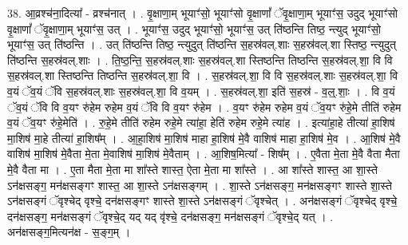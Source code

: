 \documentclass[17pt]{extarticle}
\begin{document}
38. आ॒व्रश्च॑ना॒दित्या᳚ - व्रश्च॑नात् । . वृ॒क्षाणा॒म् भूयाꣳ॑सो॒ भूयाꣳ॑सो वृ॒क्षाणां᳚ ॅवृ॒क्षाणा॒म् भूयाꣳ॑स॒ उदुद् भूयाꣳ॑सो वृ॒क्षाणां᳚ ॅवृ॒क्षाणा॒म् भूयाꣳ॑स॒ उत् । . भूयाꣳ॑स॒ उदुद् भूयाꣳ॑सो॒ भूयाꣳ॑स॒ उत् ति॑ष्ठन्ति तिष्ठ॒ न्त्युद् भूयाꣳ॑सो॒ भूयाꣳ॑स॒ उत् ति॑ष्ठन्ति । . उत् ति॑ष्ठन्ति तिष्ठ॒ न्त्युदुत् ति॑ष्ठन्ति स॒हस्र॑वल्.शाः स॒हस्र॑वल्.शा स्तिष्ठ॒ न्त्युदुत् ति॑ष्ठन्ति स॒हस्र॑वल्.शाः । . ति॒ष्ठ॒न्ति॒ स॒हस्र॑वल्.शाः स॒हस्र॑वल्.शा स्तिष्ठन्ति तिष्ठन्ति स॒हस्र॑वल्.शा॒ वि वि स॒हस्र॑वल्.शा स्तिष्ठन्ति तिष्ठन्ति स॒हस्र॑वल्.शा॒ वि । . स॒हस्र॑वल्.शा॒ वि वि स॒हस्र॑वल्.शाः स॒हस्र॑वल्.शा॒ वि व॒यं ॅव॒यं ॅवि स॒हस्र॑वल्.शाः स॒हस्र॑वल्.शा॒ वि व॒यम् । . स॒हस्र॑वल्.शा॒ इति॑ स॒हस्र॑ - व॒ल्॒.शाः॒ । . वि व॒यं ॅव॒यं ॅवि वि व॒यꣳ रु॑हेम रुहेम व॒यं ॅवि वि व॒यꣳ रु॑हेम । . व॒यꣳ रु॑हेम रुहेम व॒यं ॅव॒यꣳ रु॑हे॒मे तीति॑ रुहेम व॒यं ॅव॒यꣳ रु॑हे॒मेति॑ । . रु॒हे॒मे तीति॑ रुहेम रुहे॒मे त्या॑हा॒ हेति॑ रुहेम रुहे॒मे त्या॑ह । . इत्या॑हा॒हे तीत्या॑ हा॒शिष॑ मा॒शिष॑ मा॒हे तीत्या॑ हा॒शिष᳚म् । . आ॒हा॒शिष॑ मा॒शिष॑ माहा हा॒शिष॑ मे॒वै वाशिष॑ माहा हा॒शिष॑ मे॒व । . आ॒शिष॑ मे॒वै वाशिष॑ मा॒शिष॑ मे॒वैता मे॒ता मे॒वाशिष॑ मा॒शिष॑ मे॒वैताम् । . आ॒शिष॒मित्या᳚ - शिष᳚म् । . ए॒वैता मे॒ता मे॒वै वैता मैता मे॒वै वैता मा । . ए॒ता मैता मे॒ता मा शा᳚स्ते शास्त॒ ऐता मे॒ता मा शा᳚स्ते । . आ शा᳚स्ते शास्त॒ आ शा॒स्ते ऽन॑क्षसङ्ग॒ मन॑क्षसङ्गꣳ शास्त॒ आ शा॒स्ते ऽन॑क्षसङ्गम् । . शा॒स्ते ऽन॑क्षसङ्ग॒ मन॑क्षसङ्गꣳ शास्ते शा॒स्ते ऽन॑क्षसङ्गं ॅवृश्चेद् वृश्चे॒ दन॑क्षसङ्गꣳ शास्ते शा॒स्ते ऽन॑क्षसङ्गं ॅवृश्चेत् । . अन॑क्षसङ्गं ॅवृश्चेद् वृश्चे॒ दन॑क्षसङ्ग॒ मन॑क्षसङ्गं ॅवृश्चे॒द् यद् यद् वृ॑श्चे॒ दन॑क्षसङ्ग॒ मन॑क्षसङ्गं ॅवृश्चे॒द् यत् । . अन॑क्षसङ्ग॒मित्यन॑क्ष - स॒ङ्ग॒म् । \newline
\pagebreak
{}
\end{document}
